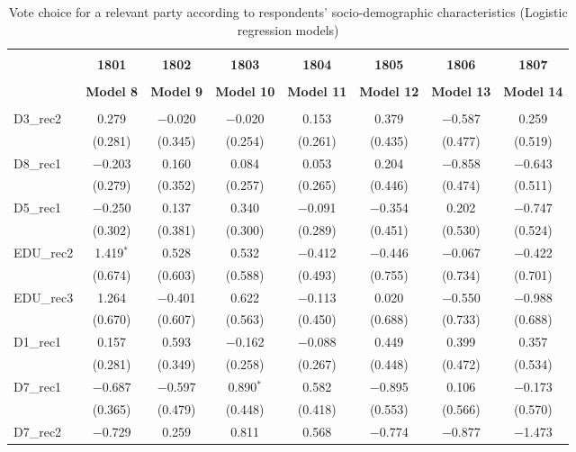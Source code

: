 \documentclass[
]{article}
\begin{document}
\begin{table}[!htbp] \centering 
  \caption{Vote choice for a relevant party according to respondents' 
                       socio-demographic characteristics (Logistic regression models)} 
  \label{table:full_logit_lu} 
\begin{tabular}{@{\extracolsep{5pt}}lccccccc} 
\\[-1.8ex]\hline \\[-1.8ex] 
 & \textbf{1801} & \textbf{1802} & \textbf{1803} & \textbf{1804} & \textbf{1805} & \textbf{1806} & \textbf{1807} \\ 
\\[-1.8ex] & \textbf{Model 8} & \textbf{Model 9} & \textbf{Model 10} & \textbf{Model 11} & \textbf{Model 12} & \textbf{Model 13} & \textbf{Model 14}\\ 
\hline \\[-1.8ex] 
 D3\_rec2 & 0.279 & $-$0.020 & $-$0.020 & 0.153 & 0.379 & $-$0.587 & 0.259 \\ 
  & (0.281) & (0.345) & (0.254) & (0.261) & (0.435) & (0.477) & (0.519) \\ 
  D8\_rec1 & $-$0.203 & 0.160 & 0.084 & 0.053 & 0.204 & $-$0.858 & $-$0.643 \\ 
  & (0.279) & (0.352) & (0.257) & (0.265) & (0.446) & (0.474) & (0.511) \\ 
  D5\_rec1 & $-$0.250 & 0.137 & 0.340 & $-$0.091 & $-$0.354 & 0.202 & $-$0.747 \\ 
  & (0.302) & (0.381) & (0.300) & (0.289) & (0.451) & (0.530) & (0.524) \\ 
  EDU\_rec2 & 1.419$^{*}$ & 0.528 & 0.532 & $-$0.412 & $-$0.446 & $-$0.067 & $-$0.422 \\ 
  & (0.674) & (0.603) & (0.588) & (0.493) & (0.755) & (0.734) & (0.701) \\ 
  EDU\_rec3 & 1.264 & $-$0.401 & 0.622 & $-$0.113 & 0.020 & $-$0.550 & $-$0.988 \\ 
  & (0.670) & (0.607) & (0.563) & (0.450) & (0.688) & (0.733) & (0.688) \\ 
  D1\_rec1 & 0.157 & 0.593 & $-$0.162 & $-$0.088 & 0.449 & 0.399 & 0.357 \\ 
  & (0.281) & (0.349) & (0.258) & (0.267) & (0.448) & (0.472) & (0.534) \\ 
  D7\_rec1 & $-$0.687 & $-$0.597 & 0.890$^{*}$ & 0.582 & $-$0.895 & 0.106 & $-$0.173 \\ 
  & (0.365) & (0.479) & (0.448) & (0.418) & (0.553) & (0.566) & (0.570) \\ 
  D7\_rec2 & $-$0.729 & 0.259 & 0.811 & 0.568 & $-$0.774 & $-$0.877 & $-$1.473 \\ 

\end{tabular}
\end{table}
\end{document}
